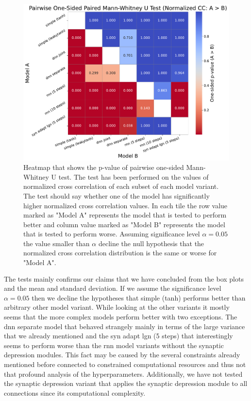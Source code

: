 \begin{figure}
    \centering
    \includegraphics[width=\linewidth]{img/plots/model_types_p_value_heatmap_cc_norm.pdf}
    \caption{Heatmap that shows the p-value of pairwise one-sided Mann-Whitney U test. The test has been performed on the values of normalized cross correlation of each subset of each model variant. The test should say whether one of the model has significantly higher normalized cross correlation values. In each tile the row value marked as "Model A" represents the model that is tested to perform better and column value marked as "Model B" represents the model that is tested to perform worse. Assuming significance level $\alpha=0.05$ the value smaller than $\alpha$ decline the null hypothesis that the normalized cross correlation distribution is the same or worse for "Model A".}
    \label{fig:model_types_p_values_heatmap}
\end{figure}

The tests mainly confirms our claims that we have concluded from the box plots and the mean and standard deviation. If we assume the significance level $\alpha=0.05$ then we decline the hypotheses that simple (tanh) performs better than arbitrary other model variant. While looking at the other variants it mostly seems that the more complex models perform better with two exceptions. The dnn separate model that behaved strangely mainly in terms of the large variance that we already mentioned and the syn adapt lgn (5 steps) that interestingly seems to perform worse than the rnn model variants without the synaptic depression modules. This fact may be caused by the several constraints already mentioned before connected to constrained computational resources and thus not that profound analysis of the hyperparameters. Additionally, we have not tested the synaptic depression variant that applies the synaptic depression module to all connections since its computational complexity.

